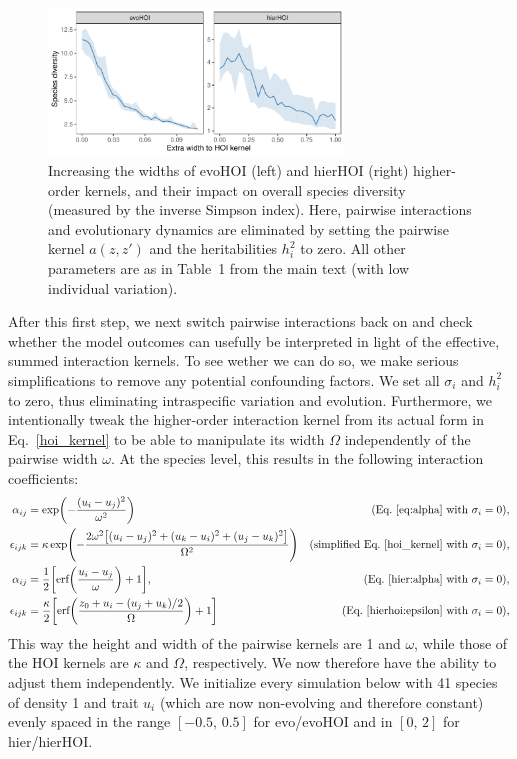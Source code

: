 \documentclass[10pt]{article}
\let\originalleft\left
\let\originalright\right
\renewcommand{\left}{\mathopen{}\mathclose\bgroup\originalleft}
\renewcommand{\right}{\aftergroup\egroup\originalright}
\begin{document}
\begin{figure}[!ht]
  \centering
  \includegraphics[width=0.7\textwidth]{widening.pdf}
  \caption{Increasing the widths of evoHOI (left) and hierHOI (right) higher-order kernels, and their impact on overall species diversity (measured by the inverse Simpson index). Here, pairwise interactions and evolutionary dynamics are eliminated by setting the pairwise kernel $a(z,z')$ and the heritabilities $h_i^2$ to zero. All other parameters are as in Table~1 from the main text (with low individual variation).}
  \label{fig:wideninghoi}
\end{figure}

After this first step, we next switch pairwise interactions back on and check whether the model outcomes can usefully be interpreted in light of the effective, summed interaction kernels. To see wether we can do so, we make serious simplifications to remove any potential confounding factors. We set all $\sigma_i$ and $h_i^2$ to zero, thus eliminating intraspecific variation and evolution. Furthermore, we intentionally tweak the higher-order interaction kernel from its actual form in Eq.~\ref{hoi_kernel} to be able to manipulate its width $\Omega$ independently of the pairwise width $\omega$. At the species level, this results in the following interaction coefficients:
\begin{align}
\alpha_{ij}
&= \exp\left(-\frac{(u_i - u_j)^2}{\omega^2}\right)
& \text{(Eq.~\ref{eq:alpha} with $\sigma_i=0$)},
\label{eq-evo-alpha-rigged}
\\
\epsilon_{ijk}
&= \kappa \exp\left(-\frac{2 \omega^2 \left[(u_i-u_j)^2+(u_k-u_i)^2
+ (u_j-u_k)^2\right]}{\Omega^2} \right)
& \text{(simplified Eq.~\ref{hoi_kernel} with $\sigma_i=0$)},
\label{eq-evo-epsilon-rigged}
\\
\alpha_{ij}
&= \frac{1}{2} \left[ \text{erf}
\left( \frac{u_i-u_j}{\omega} \right) + 1\right] ,
& \text{(Eq.~\ref{hier:alpha} with $\sigma_i = 0$)},
\label{eq-hier-alpha-rigged}
\\
\epsilon_{ijk}
&= \frac{\kappa}{2} \left[ \text{erf}
\left( \frac{z_0+u_i-(u_j+u_k)/2}{\Omega} \right) + 1 \right]
& \text{(Eq.~\ref{hierhoi:epsilon} with $\sigma_i = 0$)},
\label{eq-hier-epsilon-rigged}
\end{align}
This way the height and width of the pairwise kernels are 1 and $\omega$, while those of the HOI kernels are $\kappa$ and $\Omega$, respectively. We now therefore have the ability to adjust them independently. We initialize every simulation below with 41 species of density 1 and trait $u_i$ (which are now non-evolving and therefore constant) evenly spaced in the range $[-0.5, \, 0.5]$ for evo/evoHOI and in $[0, \, 2]$ for hier/hierHOI.
\end{document}
